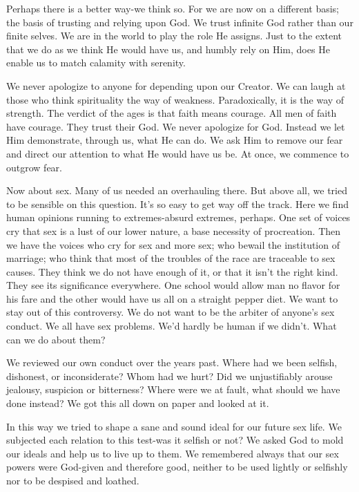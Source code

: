 \begin{biblechapter}
Perhaps there is a better way-we think so.  For we are now on a different basis; the basis of trusting and relying upon God.  We trust infinite God rather than our finite selves.  We are in the world to play the role He assigns.  Just to the extent that we do as we think He would have us, and humbly rely on Him, does He enable us to match calamity with serenity.

We never apologize to anyone for depending upon our Creator.  We can laugh at those who think spirituality the way of weakness.  Paradoxically, it is the way of strength.  The verdict of the ages is that faith means courage.  All men of faith have courage.  They trust their God.  We never apologize for God.  Instead we let Him demonstrate, through us, what He can do.  We ask Him to remove our fear and direct our attention to what He would have us be.  At once, we commence to outgrow fear.

Now about sex.  Many of us needed an overhauling there.  But above all, we tried to be sensible on this question.  It's so easy to get way off the track.  Here we find human opinions running to extremes-absurd extremes, perhaps.  One set of voices cry that sex is a lust of our lower nature, a base necessity of procreation.  Then we have the voices who cry for sex and more sex; who bewail the institution of marriage; who think that most of the troubles of the race are traceable to sex causes.  They think we do not have enough of it, or that it isn't the right kind.  They see its significance everywhere.  One school would allow man no flavor for his fare and the other would have us all on a straight pepper diet.  We want to stay out of this controversy.  We do not want to be the arbiter of anyone's sex conduct.  We all have sex problems.  We'd hardly be human if we didn't.  What can we do about them?

We reviewed our own conduct over the years past.  Where had we been selfish, dishonest, or inconsiderate?  Whom had we hurt?  Did we unjustifiably arouse jealousy, suspicion or bitterness?  Where were we at fault, what should we have done instead?  We got this all down on paper and looked at it.

In this way we tried to shape a sane and sound ideal for our future sex life.  We subjected each relation to this test-was it selfish or not?  We asked God to mold our ideals and help us to live up to them.  We remembered always that our sex powers were God-given and therefore good, neither to be used lightly or selfishly nor to be despised and loathed.


\end{biblechapter}
